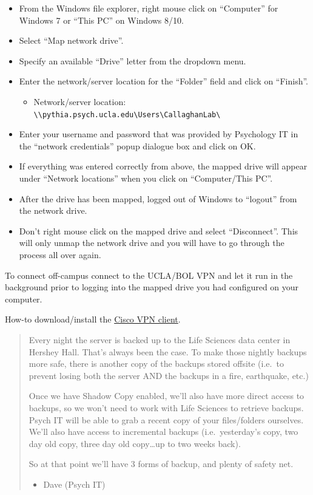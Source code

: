\documentclass[]{book}
\providecommand{\tightlist}{%
  \setlength{\itemsep}{0pt}\setlength{\parskip}{0pt}}
\begin{document}
\begin{itemize}
\tightlist
\item
  From the Windows file explorer, right mouse click on ``Computer'' for
  Windows 7 or ``This PC'' on Windows 8/10.
\item
  Select ``Map network drive''.
\item
  Specify an available ``Drive'' letter from the dropdown menu.
\item
  Enter the network/server location for the ``Folder'' field and click
  on ``Finish''.

  \begin{itemize}
  \tightlist
  \item
    Network/server location:
    \texttt{\textbackslash{}\textbackslash{}pythia.psych.ucla.edu\textbackslash{}Users\textbackslash{}CallaghanLab\textbackslash{}}
  \end{itemize}
\item
  Enter your username and password that was provided by Psychology IT in
  the ``network credentials'' popup dialogue box and click on OK.
\item
  If everything was entered correctly from above, the mapped drive will
  appear under ``Network locations'' when you click on ``Computer/This
  PC''.
\item
  After the drive has been mapped, logged out of Windows to ``logout''
  from the network drive.
\item
  Don't right mouse click on the mapped drive and select ``Disconnect''.
  This will only unmap the network drive and you will have to go through
  the process all over again.
\end{itemize}

To connect off-campus connect to the UCLA/BOL VPN and let it run in the
background prior to logging into the mapped drive you had configured on
your computer.

How-to download/install the
\href{https://help.bol.ucla.edu/kb_view.do?sysparm_article=kb0010923}{Cisco
VPN client}.

\begin{quote}
Every night the server is backed up to the Life Sciences data center in
Hershey Hall. That's always been the case. To make those nightly backups
more safe, there is another copy of the backups stored offsite (i.e.~to
prevent losing both the server AND the backups in a fire, earthquake,
etc.)

Once we have Shadow Copy enabled, we'll also have more direct access to
backups, so we won't need to work with Life Sciences to retrieve
backups. Psych IT will be able to grab a recent copy of your
files/folders ourselves. We'll also have access to incremental backups
(i.e.~yesterday's copy, two day old copy, three day old copy\ldots{}up
to two weeks back).

So at that point we'll have 3 forms of backup, and plenty of safety net.

\begin{itemize}
\tightlist
\item
  Dave (Psych IT)
\end{itemize}
\end{quote}
\end{document}
